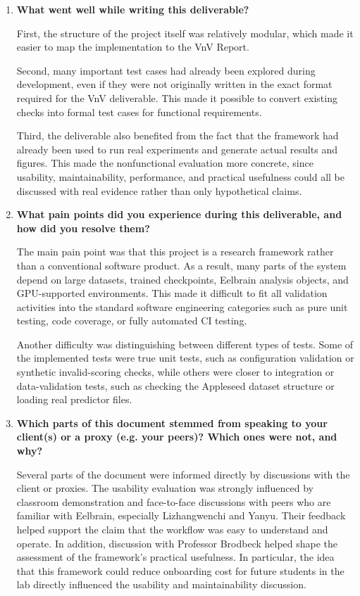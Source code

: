\documentclass[12pt, titlepage]{article}
\begin{document}
\begin{enumerate}
  \item \textbf{What went well while writing this deliverable?}

  
  First, the structure of the project itself was relatively modular, which made it easier to map the implementation to the VnV Report.


  Second, many important test cases had already been explored during development, even if they were not originally written in the exact format required for the VnV deliverable.
  This made it possible to convert existing checks into formal test cases for functional requirements.


  Third, the deliverable also benefited from the fact that the framework had already been used to run real experiments and generate actual results and figures.
  This made the nonfunctional evaluation more concrete, since usability, maintainability, performance, and practical usefulness could all be discussed with real evidence rather than only hypothetical claims.

  \item \textbf{What pain points did you experience during this deliverable, and how did you resolve them?}

  The main pain point was that this project is a research framework rather than a conventional software product.
  As a result, many parts of the system depend on large datasets, trained checkpoints, Eelbrain analysis objects, and GPU-supported environments.
  This made it difficult to fit all validation activities into the standard software engineering categories such as pure unit testing, code coverage, or fully automated CI testing.

  Another difficulty was distinguishing between different types of tests.
  Some of the implemented tests were true unit tests, such as configuration validation or synthetic invalid-scoring checks, while others were closer to integration or data-validation tests, such as checking the Appleseed dataset structure or loading real predictor files.




  \item \textbf{Which parts of this document stemmed from speaking to your client(s) or a proxy (e.g. your peers)? Which ones were not, and why?}

  Several parts of the document were informed directly by discussions with the client or proxies.
  The usability evaluation was strongly influenced by classroom demonstration and face-to-face discussions with peers who are familiar with Eelbrain, especially Lizhangwenchi and Yanyu.
  Their feedback helped support the claim that the workflow was easy to understand and operate.
  In addition, discussion with Professor Brodbeck helped shape the assessment of the framework's practical usefulness.
  In particular, the idea that this framework could reduce onboarding cost for future students in the lab directly influenced the usability and maintainability discussion.


\end{enumerate}
\end{document}
